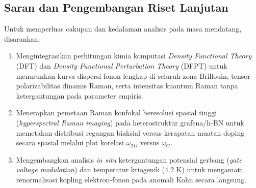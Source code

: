 \subsection{Saran dan Pengembangan Riset Lanjutan}
Untuk memperluas cakupan dan kedalaman analisis pada masa mendatang, disarankan:
\begin{enumerate}
    \item Mengintegrasikan perhitungan kimia komputasi \textit{Density Functional Theory} (DFT) dan \textit{Density Functional Perturbation Theory} (DFPT) untuk menurunkan kurva dispersi fonon lengkap di seluruh zona Brillouin, tensor polarizabilitas dinamis Raman, serta intensitas kuantum Raman tanpa ketergantungan pada parameter empiris.
    \item Menerapkan pemetaan Raman konfokal beresolusi spasial tinggi (\textit{hyperspectral Raman imaging}) pada heterostruktur grafena/h-BN untuk memetakan distribusi regangan biaksial versus kerapatan muatan doping secara spasial melalui plot korelasi $\omega_{2D}$ versus $\omega_G$.
    \item Mengembangkan analisis \textit{in situ} ketergantungan potensial gerbang (\textit{gate voltage modulation}) dan temperatur kriogenik ($4.2\text{ K}$) untuk mengamati renormalisasi kopling elektron-fonon pada anomali Kohn secara langsung.
\end{enumerate}
